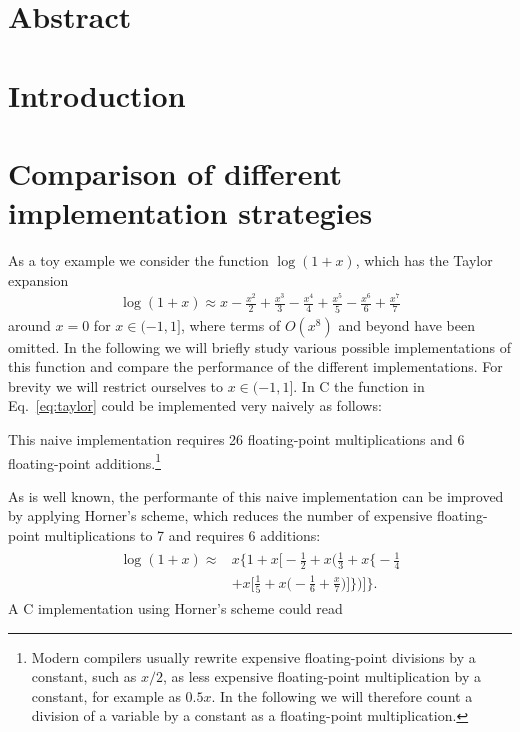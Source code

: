 \documentclass[10pt,DIV16,twocolumn]{scrartcl}
\title{\mytitle}
\author{\myauthor}
\affil{Fachbereich Energie und Biotechnologie, Hochschule Flensburg,\\ Kanzleistra{\ss}e 91--93, 24943 Flensburg, Germany}
\date{\today}
\begin{document}
\maketitle

\section*{Abstract}

\section{Introduction}

\cite{polylogarithm}

\section{Comparison of different implementation strategies}

As a toy example we consider the function $\log(1+x)$, which has the
Taylor expansion
%
\begin{align}
  \log(1+x) \approx x - \frac{x^2}{2} + \frac{x^3}{3} - \frac{x^4}{4} + \frac{x^5}{5} - \frac{x^6}{6} + \frac{x^7}{7}
  \label{eq:taylor}
\end{align}
%
around $x=0$ for $x\in(-1,1]$, where terms of $O(x^8)$ and beyond have
been omitted.  In the following we will briefly study various possible
implementations of this function and compare the performance of the
different implementations.  For brevity we will restrict ourselves to
$x\in(-1,1]$.  In C the function in Eq.~\eqref{eq:taylor} could be
implemented very naively as follows:
%

%
This naive implementation requires 26 floating-point multiplications
and 6 floating-point additions.\footnote{Modern compilers usually
  rewrite expensive floating-point divisions by a constant, such as
  $x/2$, as less expensive floating-point multiplication by a
  constant, for example as $0.5x$.  In the following we will therefore
  count a division of a variable by a constant as a floating-point
  multiplication.}

As is well known, the performante of this naive implementation can be
improved by applying Horner's scheme, which reduces the number of
expensive floating-point multiplications to 7 and requires 6
additions:
%
\begin{align}
\begin{split}
  \log(1+x) \approx{}& x \Bigg\{1 + x \Bigg[-\frac{1}{2} + x \Bigg(\frac{1}{3} + x \Bigg\{-\frac{1}{4} \\
  &+ x \Bigg[\frac{1}{5} + x\Bigg(-\frac{1}{6} + \frac{x}{7}\Bigg)\Bigg]\Bigg\}\Bigg)\Bigg]\Bigg\}.
\end{split}\label{eq:horner}%
\end{align}
%
A C implementation using Horner's scheme could read
%

\end{document}
